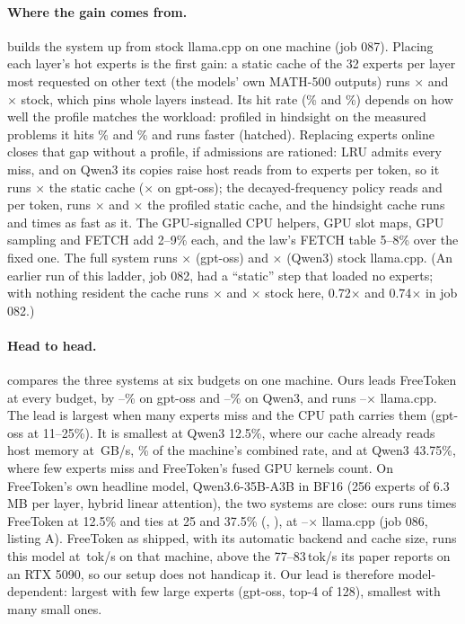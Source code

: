 \documentclass[10pt,twocolumn]{article}
\begin{document}
\paragraph{Where the gain comes from.}  builds the system up from stock llama.cpp on one machine
(job 087). Placing each layer's hot experts is the first gain: a static cache of the 32 experts per layer most
requested on other text (the models' own MATH-500 outputs) runs \ablStaticGpt$\times$ and \ablStaticQwen$\times$ stock,
which pins whole layers instead. Its hit rate (\ablStaticHitGpt\% and \ablStaticHitQwen\%) depends on how well the
profile matches the workload: profiled in hindsight on the measured problems it hits \ablHindHitGpt\% and
\ablHindHitQwen\% and runs faster (hatched). Replacing experts online closes that gap without a profile, if admissions
are rationed: LRU admits every miss, and on Qwen3 its copies raise host reads from \rdStaticQwen{} to \rdLruQwen{}
experts per token, so it runs \ablLruQwen$\times$ the static cache (\ablLruGpt$\times$ on gpt-oss); the
decayed-frequency policy reads \rdDfaGpt{} and \rdDfaQwen{} per token, runs \ablDfaStaticGpt$\times$ and
\ablDfaStaticQwen$\times$ the profiled static cache, and the hindsight cache runs \ablHindGpt{} and \ablHindQwen{} times
as fast as it. The GPU-signalled CPU helpers, GPU slot maps, GPU
sampling and FETCH add 2--9\% each, and the law's FETCH table 5--8\% over the fixed one. The full system runs
\ablGptX$\times$ (gpt-oss) and \ablQwenX$\times$ (Qwen3) stock llama.cpp. (An earlier run of this ladder, job 082, had a
``static'' step that loaded no experts; with nothing resident the cache runs \ablNoneGpt$\times$ and
\ablNoneQwen$\times$ stock here, 0.72$\times$ and 0.74$\times$ in job 082.)

\paragraph{Head to head.}  compares the three systems at six budgets on one machine. Ours leads
FreeToken at every budget, by \ftLeadGptMin--\ftLeadGptMax\% on gpt-oss and \ftLeadQwenMin--\ftLeadQwenMax\% on Qwen3,
and runs \llamaXMin--\llamaXMax$\times$ llama.cpp. The lead is largest when many experts miss and the CPU path carries
them (gpt-oss at 11--25\%). It is smallest at Qwen3 12.5\%, where our cache already reads host memory at \qlowBW\,GB/s,
\qlowBWpct\% of the machine's combined rate, and at Qwen3 43.75\%, where few experts miss and FreeToken's fused GPU kernels count.
On FreeToken's own headline model, Qwen3.6-35B-A3B
in BF16 (256 experts of 6.3\,MB per layer, hybrid linear attention), the two systems are close: ours runs
\qsixFtA{} times FreeToken at 12.5\% and ties at 25 and 37.5\% (\qsixFtB, \qsixFtC), at \qsixLlA--\qsixLlC$\times$ llama.cpp (job 086,
listing A). FreeToken as shipped, with its automatic backend and cache size, runs this model at \qsixAuto\,tok/s on that
machine, above the 77--83\,tok/s its paper reports on an RTX 5090, so our setup does not handicap it. Our lead
is therefore model-dependent: largest with few large experts (gpt-oss, top-4 of 128), smallest with many small ones.
\end{document}
